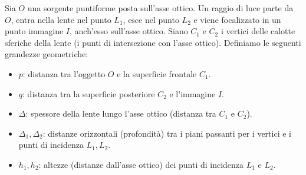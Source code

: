 \documentclass[openany,a4paper,12pt]{book}
\begin{document}
Sia $O$ una sorgente puntiforme posta sull'asse ottico. Un raggio di luce parte da $O$, entra nella lente nel punto $L_1$, esce nel punto $L_2$ e viene focalizzato in un punto immagine $I$, anch'esso sull'asse ottico. Siano $C_1$ e $C_2$ i vertici delle calotte sferiche della lente (i punti di intersezione con l'asse ottico). 
Definiamo le seguenti grandezze geometriche:
\begin{itemize}
    \item $p$: distanza tra l'oggetto $O$ e la superficie frontale $C_1$.
    \item $q$: distanza tra la superficie posteriore $C_2$ e l'immagine $I$.
    \item $\Delta$: spessore della lente lungo l'asse ottico (distanza tra $C_1$ e $C_2$).
    \item $\Delta_1, \Delta_2$: distanze orizzontali (profondità) tra i piani passanti per i vertici e i punti di incidenza $L_1, L_2$.
    \item $h_1, h_2$: altezze (distanze dall'asse ottico) dei punti di incidenza $L_1$ e $L_2$.
\end{itemize}
\end{document}

